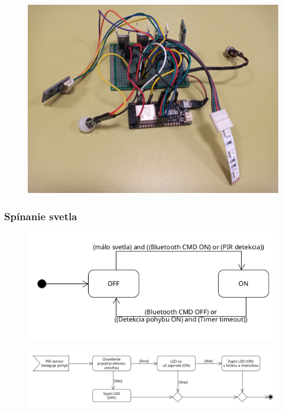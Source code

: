 \documentclass[12pt, a4paper]{article}
\begin{document}
\begin{figure}
\includegraphics[width=\textwidth]{assets/prototype.jpg}
\end{figure}

\subsubsection{Spínanie svetla}
\begin{figure}
\includegraphics[width=\textwidth]{assets/light-states.png}
\end{figure}

\begin{figure}
\includegraphics[width=\textwidth]{assets/pir-motion-detect.png}
\end{figure}
\end{document}
